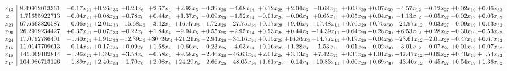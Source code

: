 \documentclass[9pt]{article}
\begin{document}
 \[\begin{array}{c| c c@{\hskip 2pt} c@{\hskip 2pt} c@{\hskip 2pt} c@{\hskip 2pt} c@{\hskip 2pt} c@{\hskip 2pt} c@{\hskip 2pt} c@{\hskip 2pt} c@{\hskip 2pt} c@{\hskip 2pt} c@{\hskip 2pt} c@{\hskip 2pt} c@{\hskip 2pt} c@{\hskip 2pt} c@{\hskip 2pt} c@{\hskip 2pt} }
 x_{13}   &  8.49912013361 & -0.17 x_{21} & +  0.26 x_{33} & +  0.23 x_{6} & +  2.67 x_{4} & +  2.93 x_{5} & -0.39 x_{26} & -4.68 x_{14} & +  0.12 x_{28} & +  2.04 x_{3} & -0.68 x_{11} & +  0.03 x_{29} & +  0.07 x_{30} & -4.57 x_{12} & -0.12 x_{27} & +  0.02 x_{19} & +  0.06 x_{32}\\
 x_{1}   &  1.71655922713 & -0.04 x_{21} & +  0.08 x_{33} & +  0.78 x_{6} & +  0.44 x_{4} & +  1.37 x_{5} & -0.09 x_{26} & -1.52 x_{14} & -0.01 x_{28} & -0.06 x_{3} & +  0.65 x_{11} & +  0.05 x_{29} & +  0.04 x_{30} & -1.13 x_{12} & -0.05 x_{27} & -0.02 x_{19} & +  0.03 x_{32}\\
 x_{23}   &  67.6663820587 & -0.06 x_{21} & +  2.01 x_{33} & + 15.68 x_{6} & -3.42 x_{4} & + 16.47 x_{5} & -1.72 x_{26} & -27.75 x_{14} & +  0.17 x_{28} & +  9.46 x_{3} & + 17.48 x_{11} & +  0.76 x_{29} & +  0.75 x_{30} & -24.97 x_{12} & -0.03 x_{27} & -0.09 x_{19} & +  0.13 x_{32}\\
 x_{20}   &  26.2919234427 & +  0.37 x_{21} & -0.07 x_{33} & +  0.22 x_{6} & +  1.84 x_{4} & -9.94 x_{5} & +  0.55 x_{26} & +  2.95 x_{14} & +  0.53 x_{28} & +  0.44 x_{3} & -14.39 x_{11} & -0.64 x_{29} & -0.28 x_{30} & +  6.53 x_{12} & +  0.28 x_{27} & -0.30 x_{19} & -0.53 x_{32}\\
 x_{24}   &  17.0792786401 & -1.60 x_{21} & +  1.91 x_{33} & + 12.39 x_{6} & + 30.49 x_{4} & + 21.21 x_{5} & -2.94 x_{26} & -34.16 x_{14} & +  0.15 x_{28} & + 16.89 x_{3} & -14.77 x_{11} & +  0.19 x_{29} & -0.04 x_{30} & -23.61 x_{12} & -2.01 x_{27} & -0.47 x_{19} & +  0.67 x_{32}\\
 x_{15}   &  11.0147709613 & -0.14 x_{21} & +  0.17 x_{33} & +  0.09 x_{6} & +  1.68 x_{4} & +  0.66 x_{5} & -0.23 x_{26} & -4.03 x_{14} & +  0.16 x_{28} & +  1.28 x_{3} & -1.53 x_{11} & -0.01 x_{29} & -0.02 x_{30} & -3.01 x_{12} & -0.07 x_{27} & +  0.01 x_{19} & +  0.07 x_{32}\\
 x_{18}   &  145.069102814 & -1.96 x_{21} & +  1.39 x_{33} & +  3.58 x_{6} & -6.58 x_{4} & +  9.58 x_{5} & -2.46 x_{26} & -46.63 x_{14} & +  2.01 x_{28} & +  3.13 x_{3} & +  7.42 x_{11} & +  0.35 x_{29} & +  1.01 x_{30} & -47.47 x_{12} & -0.09 x_{27} & +  0.40 x_{19} & +  1.54 x_{32}\\
 x_{17}   &  104.986713126 & -1.89 x_{21} & +  2.40 x_{33} & -1.70 x_{6} & +  2.08 x_{4} & + 24.29 x_{5} & -2.66 x_{26} & -48.05 x_{14} & +  1.61 x_{28} & -0.14 x_{3} & + 10.83 x_{11} & +  0.60 x_{29} & +  0.69 x_{30} & -43.40 x_{12} & -0.45 x_{27} & +  0.54 x_{19} & +  1.36 x_{32}\\

\end{array}\]
\end{document}
